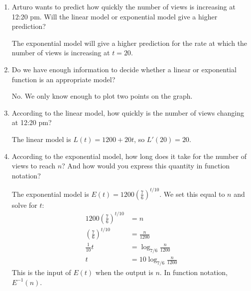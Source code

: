 \documentclass{article}
\begin{document}
\begin{enumerate}
\begin{enumerate}
  \item
    \begin{problem}[\stretch{0.3}]
      Arturo wants to predict how quickly the number of views is increasing at 12:20 pm. Will the linear model or exponential model give a higher prediction? 
    \end{problem}

    \begin{solution}
      The exponential model will give a higher prediction
      for the rate at which the number of views is increasing
      at $t=20$.
    \end{solution}

  \item


    \begin{problem}[\stretch{0.3}]
      Do we have enough information to decide whether a linear or exponential function is an appropriate model? 
    \end{problem}

    \begin{solution}
      No. We only know enough to plot two points on the graph.
    \end{solution}

  \item
    \begin{problem}[\stretch{0.3}]
      According to the linear model, how quickly is the number of views changing at 12:20 pm?
    \end{problem}

    \begin{solution}
      The linear model is $L(t) = 1200 + 20t$, so $L'(20)=20$.
    \end{solution}

  \item
    \begin{problem}[\vfill\newpage]
      According to the exponential model, how long does it take for the number of views to reach $n$? And how would you express this quantity in function notation?
    \end{problem}

    \begin{solution}
      The exponential model is $E(t) = 1200(\tfrac{7}{6})^{t/10}$. We
      set this equal to $n$ and solve for $t$:
      \begin{align*}
        1200(\tfrac{7}{6})^{t/10} &= n \\
        (\tfrac{7}{6})^{t/10} &= \tfrac{n}{1200} \\
        \tfrac{1}{10}t &= \log_{7/6} \tfrac{n}{1200} \\
        t &= 10 \log_{7/6} \tfrac{n}{1200}
      \end{align*}
      This is the input of $E(t)$ when the output is $n$. In
      function notation, $E^{-1}(n)$.
    \end{solution}


\end{enumerate}
\end{enumerate}
\end{document}

